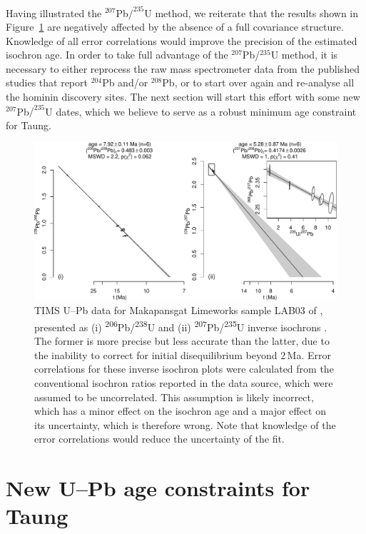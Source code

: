 \documentclass[11pt]{article}
\begin{document}
Having illustrated the ${}^{207}$Pb${/}^{235}$U method, we reiterate
that the results shown in Figure~\ref{fig:Makapansgat} are negatively
affected by the absence of a full covariance structure. Knowledge of
all error correlations would improve the precision of the estimated
isochron age.  In order to take full advantage of the
${}^{207}$Pb/${}^{235}$U method, it is necessary to either reprocess
the raw mass spectrometer data from the published studies that report
${}^{204}$Pb and/or ${}^{208}$Pb, or to start over again and
re-analyse all the hominin discovery sites. The next section will
start this effort with some new ${}^{207}$Pb${/}^{235}$U dates, which
we believe to serve as a robust minimum age constraint for
Taung.\medskip

\begin{figure}[!ht]
  \centering
  \includegraphics[width=\textwidth]{Makapansgat.pdf}
  \caption{TIMS U--Pb data for Makapansgat Limeworks sample LAB03 of
    \citet{walker2005}, presented as (i)
    \textsuperscript{206}Pb/\textsuperscript{238}U and (ii)
    \textsuperscript{207}Pb/\textsuperscript{235}U inverse isochrons
    \citep{li2021}. The former is more precise but less accurate than
    the latter, due to the inability to correct for initial
    disequilibrium beyond 2\,Ma. Error correlations for these inverse
    isochron plots were calculated from the conventional isochron
    ratios reported in the data source, which were assumed to be
    uncorrelated.  This assumption is likely incorrect, which has a
    minor effect on the isochron age and a major effect on its
    uncertainty, which is therefore wrong. Note that knowledge of the
    error correlations would reduce the uncertainty of the fit.}
  \label{fig:Makapansgat}
\end{figure}

\section{New U--Pb age constraints for Taung}
\label{sec:UPb-results}
\end{document}
